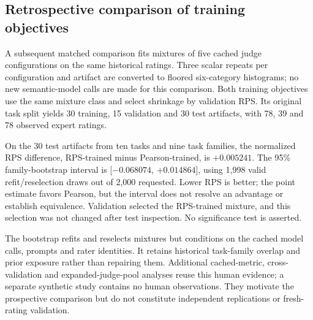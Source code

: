 \subsection{Retrospective comparison of training objectives}
A subsequent matched comparison fits mixtures of five cached judge configurations on the same historical ratings.
Three scalar repeats per configuration and artifact are converted to floored six-category histograms; no new semantic-model calls are made for this comparison.
Both training objectives use the same mixture class and select shrinkage by validation RPS.
Its original task split yields 30 training, 15 validation and 30 test artifacts, with 78, 39 and 78 observed expert ratings.

On the 30 test artifacts from ten tasks and nine task families, the normalized RPS difference, RPS-trained minus Pearson-trained, is $+0.005241$.
The 95\% family-bootstrap interval is [$-0.068074$, $+0.014864$], using 1,998 valid refit/reselection draws out of 2,000 requested.
Lower RPS is better; the point estimate favors Pearson, but the interval does not resolve an advantage or establish equivalence.
Validation selected the RPS-trained mixture, and this selection was not changed after test inspection.
No significance test is asserted.

The bootstrap refits and reselects mixtures but conditions on the cached model calls, prompts and rater identities.
It retains historical task-family overlap and prior exposure rather than repairing them.
Additional cached-metric, cross-validation and expanded-judge-pool analyses reuse this human evidence; a separate synthetic study contains no human observations.
They motivate the prospective comparison but do not constitute independent replications or fresh-rating validation.
